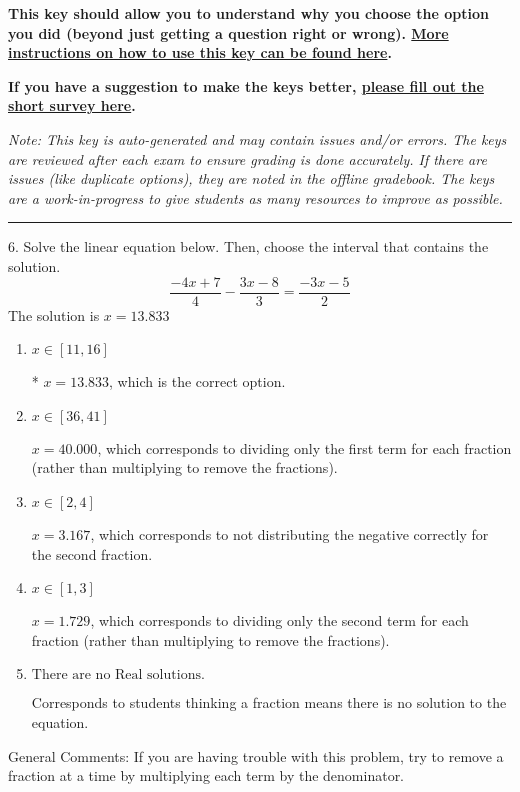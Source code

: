 \documentclass{article}[14pt]
\begin{document}
\textbf{This key should allow you to understand why you choose the option you did (beyond just getting a question right or wrong). \href{https://xronos.clas.ufl.edu/mac1105spring2020/courseDescriptionAndMisc/Exams/LearningFromResults}{More instructions on how to use this key can be found here}.}

\textbf{If you have a suggestion to make the keys better, \href{https://forms.gle/CZkbZmPbC9XALEE88}{please fill out the short survey here}.}

\textit{Note: This key is auto-generated and may contain issues and/or errors. The keys are reviewed after each exam to ensure grading is done accurately. If there are issues (like duplicate options), they are noted in the offline gradebook. The keys are a work-in-progress to give students as many resources to improve as possible.}

\rule{\textwidth}{0.4pt}

6. Solve the linear equation below. Then, choose the interval that contains the solution.
$$ \frac{-4 x + 7}{4} - \frac{3 x - 8}{3} = \frac{-3 x - 5}{2} $$ 
The solution is $ x = 13.833 $ 

\begin{enumerate}[label=\Alph*.] 
\item $ x \in [11, 16] $ 

 * $x = 13.833$, which is the correct option. 
\item $ x \in [36, 41] $ 

  $x = 40.000$, which corresponds to dividing only the first term for each fraction (rather than multiplying to remove the fractions). 
\item $ x \in [2, 4] $ 

  $x = 3.167$, which corresponds to not distributing the negative correctly for the second fraction. 
\item $ x \in [1, 3] $ 

  $x = 1.729$, which corresponds to dividing only the second term for each fraction (rather than multiplying to remove the fractions). 
\item $ \text{There are no Real solutions.} $ 

 Corresponds to students thinking a fraction means there is no solution to the equation. 
\end{enumerate} 
 
General Comments: If you are having trouble with this problem, try to remove a fraction at a time by multiplying each term by the denominator.
\end{document}
